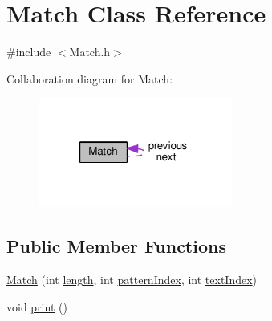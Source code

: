 \hypertarget{classMatch}{\section{Match Class Reference}
\label{classMatch}
}


{\ttfamily \#include $<$Match.\+h$>$}



Collaboration diagram for Match\+:\nopagebreak
\begin{figure}[H]
\begin{center}
\leavevmode
\includegraphics[width=181pt]{classMatch__coll__graph}
\end{center}
\end{figure}
\subsection*{Public Member Functions}
\begin{DoxyCompactItemize}
\item 
\hyperlink{classMatch_a05b81a2405d43e106a8b2488a4108c56}{Match} (int \hyperlink{classMatch_aa7e6b74eb7831de7a921ef7d3655d19a}{length}, int \hyperlink{classMatch_ac673bad1075e5499f0d857ed0a526fa2}{pattern\+Index}, int \hyperlink{classMatch_aee534a2e3d23f7d069a618e1cb7b6343}{text\+Index})
\item 
void \hyperlink{classMatch_a4f14830202018dc00166f78572c11c8f}{print} ()
\end{DoxyCompactItemize}
